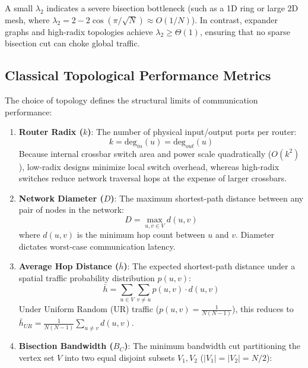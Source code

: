 A small $\lambda_2$ indicates a severe bisection bottleneck (such as a 1D ring or large 2D mesh, where $\lambda_2 = 2 - 2\cos(\pi / \sqrt{N}) \approx O(1/N)$). In contrast, expander graphs and high-radix topologies achieve $\lambda_2 \ge \Theta(1)$, ensuring that no sparse bisection cut can choke global traffic.

\subsection{Classical Topological Performance Metrics}
\label{subsec:ch4_classic_metrics}

The choice of topology defines the structural limits of communication performance:
\begin{enumerate}
    \item \textbf{Router Radix ($k$)}: The number of physical input/output ports per router:
    \begin{equation}
    k = \text{deg}_{in}(u) = \text{deg}_{out}(u)
    \label{eq:ch4_radix}
    \end{equation}
    Because internal crossbar switch area and power scale quadratically ($O(k^2)$), low-radix designs minimize local switch overhead, whereas high-radix switches reduce network traversal hops at the expense of larger crossbars.
    \item \textbf{Network Diameter ($D$)}: The maximum shortest-path distance between any pair of nodes in the network:
    \begin{equation}
    D = \max_{u, v \in V} d(u, v)
    \label{eq:ch4_diameter}
    \end{equation}
    where $d(u, v)$ is the minimum hop count between $u$ and $v$. Diameter dictates worst-case communication latency.
    \item \textbf{Average Hop Distance ($\bar{h}$)}: The expected shortest-path distance under a spatial traffic probability distribution $p(u, v)$:
    \begin{equation}
    \bar{h} = \sum_{u \in V} \sum_{v \ne u} p(u, v) \cdot d(u, v)
    \label{eq:ch4_avghop}
    \end{equation}
    Under Uniform Random (UR) traffic ($p(u, v) = \frac{1}{N(N-1)}$), this reduces to $\bar{h}_{UR} = \frac{1}{N(N-1)} \sum_{u \ne v} d(u, v)$.
    \item \textbf{Bisection Bandwidth ($B_C$)}: The minimum bandwidth cut partitioning the vertex set $V$ into two equal disjoint subsets $V_1, V_2$ ($|V_1| = |V_2| = N/2$):
    \begin{equation}

\end{equation}
\end{enumerate}
